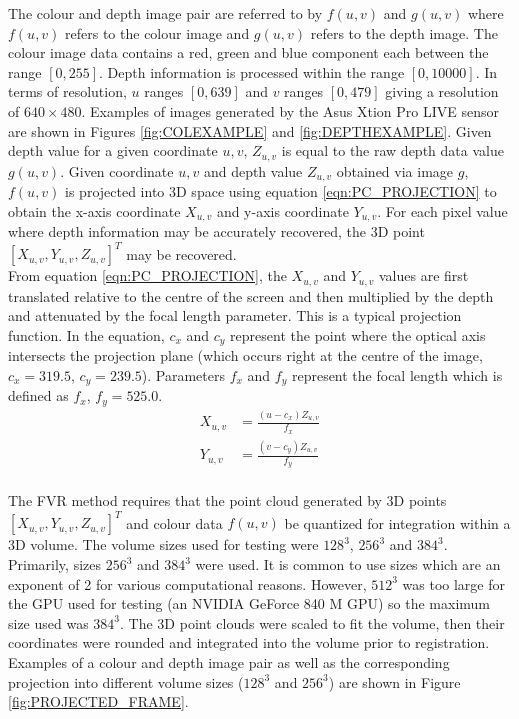 The colour and depth image pair are referred to by $f(u,v)$ and $g(u,v)$ where $f(u,v)$ refers to the colour image and $g(u,v)$ refers to the depth image. The colour image data contains a red, green and blue component each between the range $[0,255]$. Depth information is processed within the range $[0,10000]$. In terms of resolution, $u$ ranges $[0,639]$ and $v$ ranges $[0,479]$ giving a resolution of $640 \times 480$. Examples of images generated by the Asus Xtion Pro LIVE sensor are shown in Figures \ref{fig:COLEXAMPLE} and \ref{fig:DEPTHEXAMPLE}. Given depth value for a given coordinate $u,v$, $Z_{u,v}$ is equal to the raw depth data value $g(u,v)$. Given coordinate $u,v$ and depth value $Z_{u,v}$ obtained via image $g$, $f(u,v)$ is projected into 3D space using equation \ref{eqn:PC_PROJECTION} to obtain the x-axis coordinate $X_{u,v}$ and y-axis coordinate $Y_{u,v}$. For each pixel value where depth information may be accurately recovered, the 3D point $[X_{u,v}, Y_{u,v}, Z_{u,v}]^T$ may be recovered. \\

From equation \ref{eqn:PC_PROJECTION}, the $X_{u,v}$ and $Y_{u,v}$ values are first translated relative to the centre of the screen and then multiplied by the depth and attenuated by the focal length parameter. This is a typical projection function. In the equation, $c_x$ and $c_y$ represent the point where the optical axis intersects the projection plane (which occurs right at the centre of the image, $c_x = 319.5$, $c_y = 239.5$). Parameters $f_x$ and $f_y$ represent the focal length which is defined as $f_x$, $f_y = 525.0$. \\


\begin{equation} \label{eqn:PC_PROJECTION}
\begin{split}
X_{u,v} & = \frac{(u - c_x)Z_{u,v}}{f_x} \\
Y_{u,v} & = \frac{(v - c_y)Z_{u,v}}{f_y} \\
\end{split}
\end{equation}

The FVR method requires that the point cloud generated by 3D points $[X_{u,v}, Y_{u,v}, Z_{u,v}]^T$ and colour data $f(u,v)$ be quantized for integration within a 3D volume. The volume sizes used for testing were $128^3$, $256^3$ and $384^3$. Primarily, sizes $256^3$ and $384^3$ were used. It is common to use sizes which are an exponent of 2 for various computational reasons. However, $512^3$ was too large for the GPU used for testing (an NVIDIA GeForce 840 M GPU) so the maximum size used was $384^3$. The 3D point clouds were scaled to fit the volume, then their coordinates were rounded and integrated into the volume prior to registration. Examples of a colour and depth image pair as well as the corresponding projection into different volume sizes ($128^3$ and $256^3$) are shown in Figure \ref{fig:PROJECTED_FRAME}.  \\

